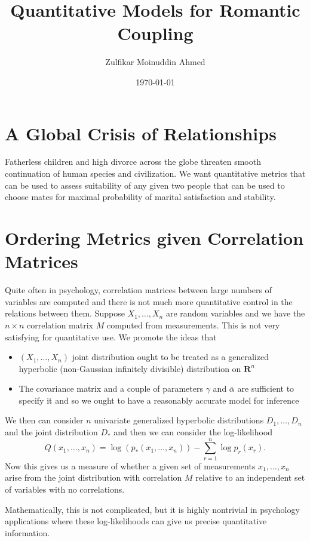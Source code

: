 \documentclass{article}
\title{Quantitative Models for Romantic Coupling}
\author{Zulfikar Moinuddin Ahmed}
\begin{document}
\date{\today}
\maketitle
\section{A Global Crisis of Relationships}
Fatherless children and high divorce across the globe threaten smooth continuation of human species and civilization.  We want quantitative metrics that can be used to assess suitability of any given two people that can be used to choose mates for maximal probability of marital satisfaction and stability.

\section{Ordering Metrics given Correlation Matrices}
Quite often in psychology, correlation matrices between large numbers of variables are computed and there is not much more quantitative control in the relations between them.  Suppose $X_1, \dots, X_n$ are random variables and we have the $n\times n$ correlation matrix $M$ computed from measurements.  This is not very satisfying for quantitative use.  We promote the ideas that
\begin{itemize}
\item $(X_1, \dots, X_n)$ joint distribution ought to be treated as a generalized hyperbolic (non-Gaussian infinitely divisible) distribution on $\mathbf{R}^n$
\item The covariance matrix and a couple of parameters $\gamma$ and $\bar{\alpha}$ are sufficient to specify it and so we ought to have a reasonably accurate model for inference
\end{itemize}

We then can consider $n$ univariate generalized hyperbolic distributions $D_1,\dots,D_n$ and the joint distribution $D_{*}$ and then we can consider the log-likelihood 
\[
Q(x_1, \dots, x_n) = \log( p_{*}(x_1, \dots, x_n)) - \sum_{r=1}^n \log p_r(x_r).
\]
Now this gives us a measure of whether a given set of measurements $x_1, \dots, x_n$ arise from the joint distribution with correlation $M$ relative to an independent set of variables with no correlations.  

Mathematically, this is not complicated, but it is highly nontrivial in psychology applications where these log-likelihoods can give us precise quantitative information. 
\end{document}
